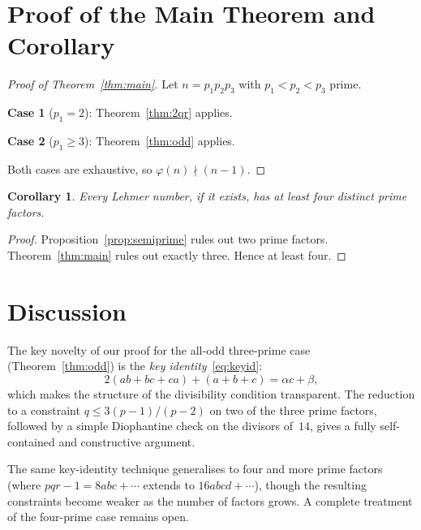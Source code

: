 \documentclass[12pt,a4paper]{amsart}
\newtheorem{corollary}[theorem]{Corollary}
\theoremstyle{definition}
\newcommand{\euler}{\varphi}
\begin{document}
\section{Proof of the Main Theorem and Corollary}

\begin{proof}[Proof of Theorem~\ref{thm:main}]
Let $n = p_1 p_2 p_3$ with $p_1 < p_2 < p_3$ prime.

\textbf{Case 1} ($p_1 = 2$): Theorem~\ref{thm:2qr} applies.

\textbf{Case 2} ($p_1 \ge 3$): Theorem~\ref{thm:odd} applies.

Both cases are exhaustive, so $\euler(n) \nmid (n-1)$.
\end{proof}

\begin{corollary}
\label{cor:four}
Every Lehmer number, if it exists, has at least four distinct prime factors.
\end{corollary}

\begin{proof}
Proposition~\ref{prop:semiprime} rules out two prime factors.
Theorem~\ref{thm:main} rules out exactly three.  Hence at least four.
\end{proof}

\section{Discussion}

The key novelty of our proof for the all-odd three-prime case
(Theorem~\ref{thm:odd}) is the \emph{key identity}~\eqref{eq:keyid}:
\[
  2(ab + bc + ca) + (a + b + c) = \alpha c + \beta,
\]
which makes the structure of the divisibility condition transparent.  The
reduction to a constraint $q \le 3(p-1)/(p-2)$ on two of the three prime
factors, followed by a simple Diophantine check on the divisors of~$14$,
gives a fully self-contained and constructive argument.

The same key-identity technique generalises to four and more prime factors
(where $pqr-1 = 8abc + \cdots$ extends to $16abcd + \cdots$), though the
resulting constraints become weaker as the number of factors grows.  A
complete treatment of the four-prime case remains open.

\end{document}

